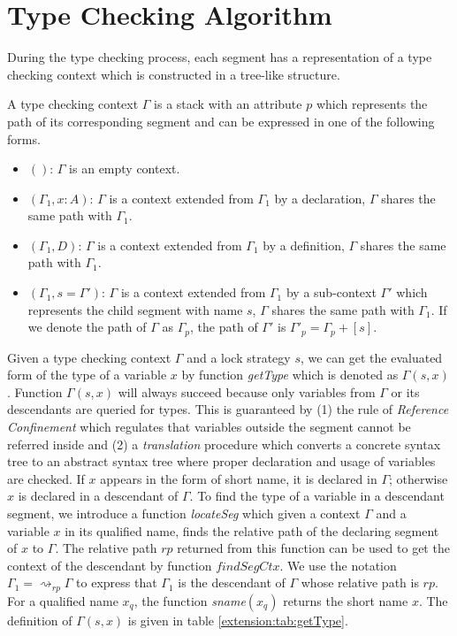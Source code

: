 \section{Type Checking Algorithm}\label{extension:sec:type-check}
During the type checking process, each segment has a representation of a type checking context which is constructed in a tree-like structure.
\begin{definition}
  A type checking context $\Gamma$ is a stack with an attribute $p$ which represents the path of its corresponding segment and can be expressed in one of the following forms.
  \begin{itemize}
  \item $()$: $\Gamma$ is an empty context.
  \item $(\Gamma_1, x : A)$: $\Gamma$ is a context extended from $\Gamma_1$ by a declaration, $\Gamma$ shares the same path with $\Gamma_1$.
  \item $(\Gamma_1, D)$: $\Gamma$ is a context extended from $\Gamma_1$ by a definition, $\Gamma$ shares the same path with $\Gamma_1$.
  \item $(\Gamma_1, s=\Gamma')$: $\Gamma$ is a context extended from $\Gamma_1$ by a sub-context $\Gamma'$ which represents the child segment with name $s$, $\Gamma$ shares the same path with $\Gamma_1$. If we denote the path of $\Gamma$ as $\Gamma_p$, the path of $\Gamma'$ is $\Gamma'_p = \Gamma_p + [s]$.
  \end{itemize}
\end{definition}
Given a type checking context $\Gamma$ and a lock strategy $s$, we can get the evaluated form of the type of a variable $x$ by function \emph{getType} which is denoted as $\Gamma(s,x)$. Function $\Gamma(s,x)$ will always succeed because only variables from $\Gamma$ or its descendants are queried for types. This is guaranteed by (1) the rule of \emph{Reference Confinement} which regulates that variables outside the segment cannot be referred inside and (2) a \emph{translation} procedure which converts a concrete syntax tree to an abstract syntax tree where proper declaration and usage of variables are checked. If $x$ appears in the form of short name, it is declared in $\Gamma$; otherwise $x$ is declared in a descendant of $\Gamma$. To find the type of a variable in a descendant segment, we introduce a function \emph{locateSeg} which given a context $\Gamma$ and a variable $x$ in its qualified name, finds the relative path of the declaring segment of $x$ to $\Gamma$. The relative path $rp$ returned from this function can be used to get the context of the descendant by function $findSegCtx$. We use the notation $\Gamma_1 = \rightsquigarrow_{rp}\Gamma$ to express that $\Gamma_1$ is the descendant of $\Gamma$ whose relative path is $rp$. For a qualified name $x_q$, the function \emph{sname}$(x_q)$ returns the short name $x$. The definition of $\Gamma(s,x)$ is given in table \ref{extension:tab:getType}.
